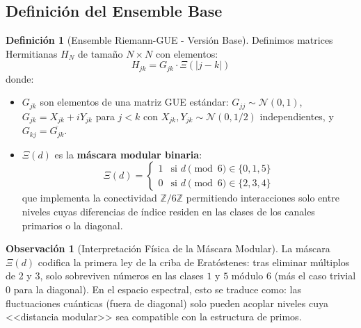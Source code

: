 \documentclass[12pt, a4paper]{article}
\theoremstyle{plain}
\theoremstyle{definition}
\newtheorem{definicion}[teorema]{Definición}
\newtheorem{observacion}[teorema]{Observación}
\theoremstyle{remark}
\newcommand{\Z}{\mathbb{Z}}
\begin{document}
\subsection{Definición del Ensemble Base}
\label{subsec:definicion_ensemble}

\begin{definicion}[Ensemble Riemann-GUE - Versión Base]
\label{def:ensemble_base}
Definimos matrices Hermitianas $H_N$ de tamaño $N \times N$ con elementos:
\[
H_{jk} = G_{jk} \cdot \Xi(|j-k|)
\]
donde:
\begin{itemize}
\item $G_{jk}$ son elementos de una matriz GUE estándar: $G_{jj} \sim \mathcal{N}(0,1)$, $G_{jk} = X_{jk} + i Y_{jk}$ para $j < k$ con $X_{jk}, Y_{jk} \sim \mathcal{N}(0,1/2)$ independientes, y $G_{kj} = \overline{G_{jk}}$.

\item $\Xi(d)$ es la \textbf{máscara modular binaria}:
\[
\Xi(d) = 
\begin{cases}
1 & \text{si } d \pmod{6} \in \{0, 1, 5\} \\
0 & \text{si } d \pmod{6} \in \{2, 3, 4\}
\end{cases}
\]
que implementa la conectividad $\Z/6\Z$ permitiendo interacciones solo entre niveles cuyas diferencias de índice residen en las clases de los canales primarios o la diagonal.
\end{itemize}
\end{definicion}

\begin{observacion}[Interpretación Física de la Máscara Modular]
La máscara $\Xi(d)$ codifica la primera ley de la criba de Eratóstenes: tras eliminar múltiplos de 2 y 3, solo sobreviven números en las clases $1$ y $5$ módulo 6 (más el caso trivial 0 para la diagonal). En el espacio espectral, esto se traduce como: las fluctuaciones cuánticas (fuera de diagonal) solo pueden acoplar niveles cuya <<distancia modular>> sea compatible con la estructura de primos.
\end{observacion}

\end{document}
